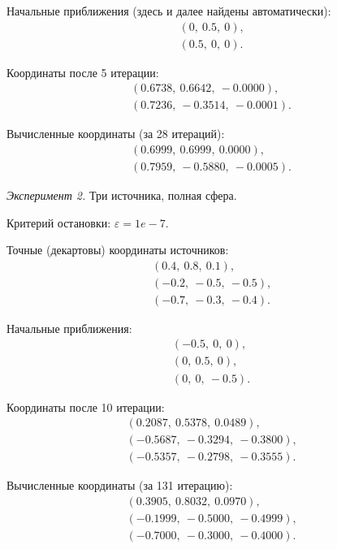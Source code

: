 Начальные приближения (здесь и далее найдены автоматически):
\begin{align}
    (0,\ 0.5,\ 0) \text{,}\nonumber\\
    (0.5,\ 0,\ 0) \text{.}\nonumber
\end{align}

Координаты после 5 итерации:
\begin{align}
    (0.6738,\ 0.6642,\ -0.0000) \text{,}\nonumber\\
    (0.7236,\ -0.3514,\ -0.0001) \text{.}\nonumber
\end{align}

Вычисленные координаты (за 28 итераций):
\begin{align}
    (0.6999,\ 0.6999,\ 0.0000) \text{,}\nonumber\\
    (0.7959,\ -0.5880,\ -0.0005) \text{.}\nonumber
\end{align}

\emph{Эксперимент 2.} Три источника, полная сфера.

Критерий остановки: $\varepsilon = 1e-7$.

Точные (декартовы) координаты источников:
\begin{align}
    (0.4,\ 0.8,\ 0.1) \text{,}\nonumber\\
    (-0.2,\ -0.5,\ -0.5) \text{,}\nonumber\\
    (-0.7,\ -0.3,\ -0.4) \text{.}\nonumber
\end{align}

Начальные приближения:
\begin{align}
    (-0.5,\ 0,\ 0) \text{,}\nonumber\\
    (0,\ 0.5,\ 0) \text{,}\nonumber\\
    (0,\ 0,\ -0.5) \text{.}\nonumber
\end{align}

Координаты после 10 итерации:
\begin{align}
    (0.2087,\ 0.5378,\ 0.0489) \text{,}\nonumber\\
    (-0.5687,\ -0.3294,\ -0.3800) \text{,}\nonumber\\
    (-0.5357,\ -0.2798,\ -0.3555) \text{.}\nonumber
\end{align}

Вычисленные координаты (за 131 итерацию):
\begin{align}
    (0.3905,\ 0.8032,\ 0.0970) \text{,}\nonumber\\
    (-0.1999,\ -0.5000,\ -0.4999) \text{,}\nonumber\\
    (-0.7000,\ -0.3000,\ -0.4000) \text{.}\nonumber
\end{align}

